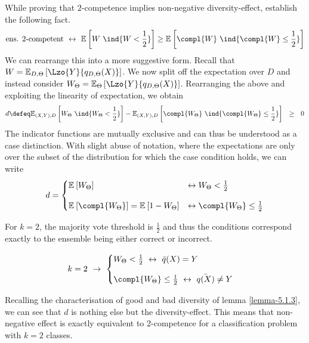 \documentclass[../main.tex]{subfiles}
\begin{document}
While proving that $2$-competence implies non-negative diversity-effect, \cite{theisen} establish the following fact.
\begin{align}
\label{eq:competence-lemma2}
\text{ens. $2$-competent} ~\leftrightarrow~ \mathbb{E}_{}\left[ W~\ind{W < \frac{1}{2}} \right] \geq \mathbb{E}_{}\left[ 
\compl{W}~\ind{\compl{W} \leq \frac{1}{2} } 
\right] 
\end{align}
We can rearrange this into a more suggestive form. Recall that $W = \mathbb{E}_{D, \Theta}\left[ \Lzo{Y}{q_{D,\Theta}(X)} \right]$. We now split off the expectation over $D$ and instead consider $W_{\Theta} = \mathbb{E}_{\Theta}\left[ \Lzo{Y}{q_{D, \Theta}(X)} \right]$. Rearranging the above and exploiting the linearity of expectation, we obtain
$$
d \defeq \mathbb{E}_{(X,Y),D }\left[ W_{\Theta} ~\ind{W_{\Theta} < \frac{1}{2}} \right]  - \mathbb{E}_{(X,Y) ,D}\left[ \compl{W_{\Theta}} ~\ind{\compl{W_{\Theta}} \leq \frac{1}{2} } \right] ~ ~ \geq ~ ~  0
$$
The indicator functions are mutually exclusive and can thus be understood as a case distinction. With slight abuse of notation, where the expectations are only over the subset of the distribution for which the case condition holds, we can write
$$
d = 
\begin{cases}
\mathbb{E}_{}\left[ W_{\Theta} \right] & \leftrightarrow W_{\Theta} < \frac{1}{2} \\[1em]
\mathbb{E}_{}\left[ \compl{W_{\Theta}}  \right]  = \mathbb{E}_{}\left[ 1 - W_{\Theta} \right]  & \leftrightarrow \compl{W_{\Theta}} \leq \frac{1}{2} 
\end{cases}
$$

For $k=2$, the majority vote threshold is $\frac{1}{2}$ and thus the conditions correspond exactly to the ensemble being either correct or incorrect.

\begin{align}
\label{eq:gen-error-ratio-binary}
k = 2 ~\rightarrow~ 
\begin{cases}
W_{\Theta}  < \frac{1}{2} ~\leftrightarrow~  \bar{q}(X) = Y \\[1em]
\compl{W_\Theta }  \leq \frac{1}{2} ~\leftrightarrow~ \bar{q(X)} \not= Y
\end{cases}
\end{align}

Recalling the characterisation of good and bad diversity of lemma \ref{lemma-5.1.3}, we can see that $d$ is nothing else but the diversity-effect. This means that non-negative effect is exactly equivalent to $2$-competence for a classification problem with $k=2$ classes.
\end{document}
